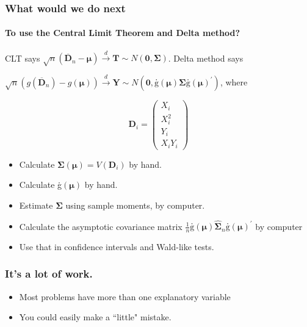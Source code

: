 \documentclass[serif]{beamer} %
\begin{document}
\begin{frame}
\frametitle{What would we do next}
\framesubtitle{To use the Central Limit Theorem and Delta method?} 
CLT says $\sqrt{n}(\overline{\mathbf{D}}_n-\boldsymbol{\mu}) \stackrel{d}{\rightarrow} 
    \mathbf{T} \sim N\left(\mathbf{0}, \boldsymbol{\Sigma} \right)$. Delta method says

 $\sqrt{n}(g(\overline{\mathbf{D}}_n)-g(\boldsymbol{\mu})) \stackrel{d}{\rightarrow} 
\mathbf{Y} \sim N(\mathbf{0},
\mbox{\.{g}}(\boldsymbol{\mu})\mathbf{\Sigma}\mbox{\.{g}}(\boldsymbol{\mu}) ^\prime)$, where

{\small
\begin{displaymath}
    \mathbf{D}_i = 
    \left( 
    \begin{array}{c}
    X_i \\ X^2_i \\ Y_i \\ X_i Y_i 
    \end{array}
    \right)
\end{displaymath} }

  \begin{itemize}
    \item Calculate $\boldsymbol{\Sigma}(\boldsymbol{\mu}) = V(\mathbf{D}_i)$ by hand.
    \item Calculate \.{g}$(\boldsymbol{\mu})$ by hand.
    \item Estimate $\boldsymbol{\Sigma}$ using sample moments, by computer.
    \item Calculate the asymptotic covariance matrix 
    $\frac{1}{n}\mbox{\.{g}}(\boldsymbol{\mu})
\widehat{\boldsymbol{\Sigma}}_n \mbox{\.{g}}(\boldsymbol{\mu}) ^\prime$ by computer
    \item Use that in confidence intervals and Wald-like tests.
  \end{itemize}
\end{frame}

\begin{frame}
\frametitle{It's a lot of work.}
  \begin{itemize}
    \item Most problems have more than one explanatory variable
    \item You could easily make a ``little" mistake.
  \end{itemize}
\end{frame}
\end{document}
